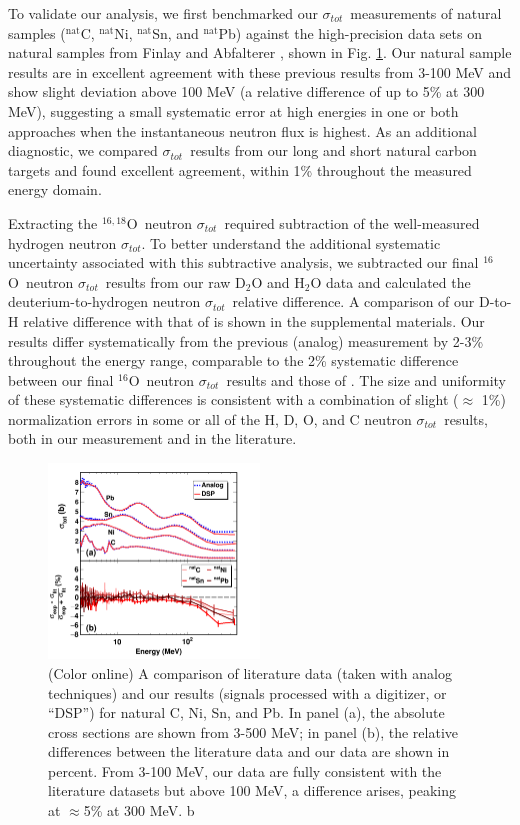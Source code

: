 \documentclass[twocolumn,secnumarabic,amssymb, nobibnotes, aps, prl,
superscriptaddress, nobalancelastpage]{revtex4}
\newcommand{\tot}{\ensuremath{\sigma_{tot}}}
\newcommand{\oSix}{\ensuremath{^{16}}O}
\newcommand{\oSixEight}{\ensuremath{^{16,18}}O}
\begin{document}
To validate our analysis, we first benchmarked our \tot\ measurements of natural samples
($^{\text{nat}}$C, $^{\text{nat}}$Ni, $^{\text{nat}}$Sn, and
$^{\text{nat}}$Pb) against the high-precision data sets on natural samples from Finlay
\cite{Finlay1993} and Abfalterer \cite{Abfalterer2001}, shown in Fig.
\ref{LiteratureBenchmarking}. Our natural sample results
are in excellent agreement with 
these previous results from 3-100 MeV and show slight deviation above 100 MeV (a
relative difference of up to 5\% at 300 MeV), suggesting a small systematic
error at high energies in one or both approaches when the instantaneous neutron
flux is highest. As an additional diagnostic, we compared 
\tot\ results from our long and short natural carbon targets and
found excellent agreement, within 1\% throughout the measured energy domain.

Extracting the \oSixEight\ neutron \tot\ required subtraction of the
well-measured hydrogen neutron \tot. To better understand
the additional systematic uncertainty
associated with this subtractive analysis, we subtracted our final
\oSix\ neutron \tot\ results from our raw D$_{2}$O and H$_{2}$O data and 
calculated the deuterium-to-hydrogen neutron \tot\ relative difference. A
comparison of our D-to-H relative difference with that of
\cite{Abfalterer1998} is shown in the supplemental materials. Our results differ
systematically from the previous (analog) measurement by 2-3\% throughout the
energy range, comparable to the 2\% systematic difference between our final
\oSix\ neutron \tot\ results and those of \cite{Abfalterer2001}. The size and
uniformity of these systematic differences is consistent with
a combination of slight ($\approx$ 1\%) normalization errors
in some or all of the H, D, O, and C neutron \tot\ results,
both in our measurement and in the literature.

\begin{figure}
    \includegraphics[width=0.5\textwidth]{figures/literatureBenchmarking.png}
    \caption{(Color online) A comparison of literature data (taken with analog
    techniques) and our results (signals processed with a digitizer, or ``DSP'')
    for natural C, Ni, Sn, and Pb. In panel (a), the absolute cross sections are shown from
    3-500 MeV; in panel (b), the relative differences between the literature data and
    our data are shown in percent. From 3-100 MeV, our data are fully consistent with the
    literature datasets but above 100 MeV, a difference arises, peaking at
    $\approx$5\% at 300 MeV.
b}
    \label{LiteratureBenchmarking}
\end{figure}
\end{document}

